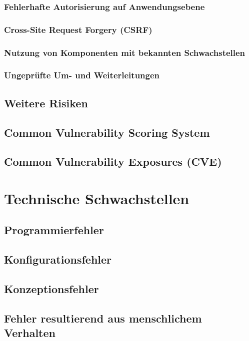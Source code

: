 \subsubsection{Fehlerhafte Autorisierung auf Anwendungsebene}

\subsubsection{Cross-Site Request Forgery (CSRF)}

\subsubsection{Nutzung von Komponenten mit bekannten Schwachstellen}

\subsubsection{Ungeprüfte Um- und Weiterleitungen}

\subsection{Weitere Risiken}

\subsection{Common Vulnerability Scoring System}

\subsection{Common Vulnerability Exposures (CVE)}

\section{Technische Schwachstellen}

\subsection{Programmierfehler}

\subsection{Konfigurationsfehler}

\subsection{Konzeptionsfehler}

\subsection{Fehler resultierend aus menschlichem Verhalten}